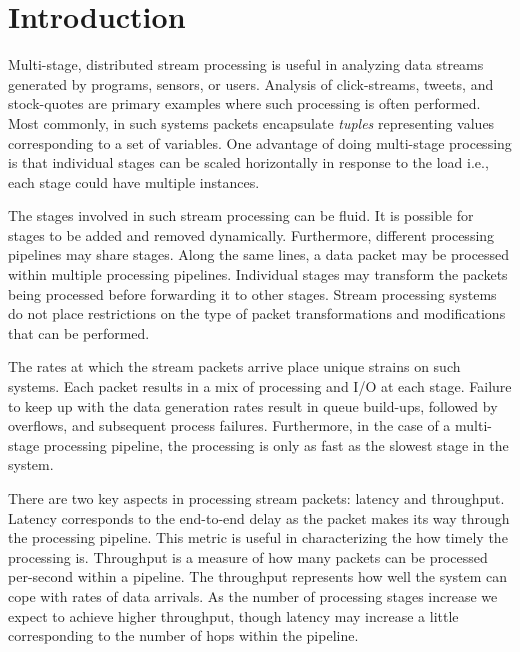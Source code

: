 \section{Introduction}

Multi-stage, distributed stream processing is useful in analyzing data streams generated by programs, sensors, or users. Analysis of click-streams, tweets, and stock-quotes are primary examples where such processing is often performed. Most commonly, in such systems packets encapsulate \textit{tuples} representing values corresponding to a set of variables. One advantage of doing multi-stage processing is that individual stages can be scaled horizontally in response to the load i.e., each stage could have multiple instances.

The stages involved in such stream processing can be fluid.  It is possible for stages to be added and removed dynamically. Furthermore, different processing pipelines may share stages. Along the same lines, a data packet may be processed within multiple processing pipelines. Individual stages may transform the packets being processed before forwarding it to other stages. Stream processing systems do not place restrictions on the type of packet transformations and modifications that can be performed. 

The rates at which the stream packets arrive place unique strains on such systems. Each packet results in a mix of processing and I/O at each stage. Failure to keep up with the data generation rates result in queue build-ups, followed by overflows, and subsequent process failures. Furthermore, in the case of a multi-stage processing pipeline, the processing is only as fast as the slowest stage in the system.

There are two key aspects in processing stream packets: latency and throughput. Latency corresponds to the end-to-end delay as the packet makes its way through the processing pipeline. This metric is useful in characterizing the how timely the processing is. Throughput is a measure of how many packets can be processed per-second within a pipeline. The throughput represents how well the system can cope with rates of data arrivals. As the number of processing stages increase we expect to achieve higher throughput, though latency may increase a little corresponding to the number of hops within the pipeline.

